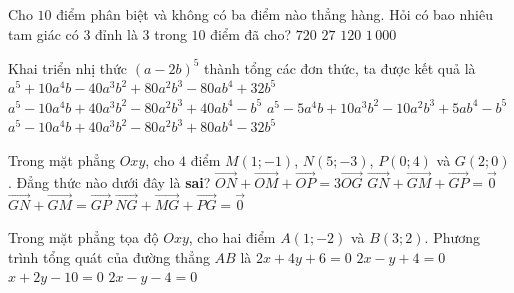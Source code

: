 \begin{ex}%
Cho $10$ điểm phân biệt và không có ba điểm nào thẳng hàng. Hỏi có bao nhiêu tam giác có $3$ đỉnh là $3$ trong $10$ điểm đã cho?
\choice
{$720$}
{$27$}
{\True $120$}
{$1\,000$}
\end{ex}

\begin{ex}%
Khai triển nhị thức $(a-2b)^5$ thành tổng các đơn thức, ta được kết quả là
\choice
{$a^5+ 10a^4b- 40a^3b^2+ 80a^2b^3- 80ab^4+ 32b^5$}
{$a^5- 10a^4b+ 40a^3b^2- 80a^2b^3+ 40ab^4- b^5$}
{$a^5- 5a^4b+ 10a^3b^2- 10a^2b^3+ 5ab^4- b^5$}
{\True $a^5- 10a^4b+ 40a^3b^2- 80a^2b^3+ 80ab^4- 32b^5$}
\end{ex}

\begin{ex}%
Trong mặt phẳng $Oxy$, cho $4$ điểm $M(1;-1)$, $N(5;-3)$, $P(0;4)$ và $G(2;0)$. Đẳng thức nào dưới đây là \textbf{sai}?
\choice
{$\overrightarrow{ON}+\overrightarrow{OM}+\overrightarrow{OP}=3\overrightarrow{OG}$}
{$\overrightarrow{GN}+\overrightarrow{GM}+\overrightarrow{GP}=\overrightarrow{0}$}
{\True $\overrightarrow{GN}+\overrightarrow{GM}=\overrightarrow{GP}$}
{$\overrightarrow{NG}+\overrightarrow{MG}+\overrightarrow{PG}=\overrightarrow{0}$}
\end{ex}

\begin{ex}%
Trong mặt phẳng tọa độ $O x y$, cho hai điểm $A(1 ;-2)$ và $B(3 ; 2)$. Phương trình tổng quát của đường thẳng $A B$ là
\choice
{$2 x+4 y+6=0$}
{$2 x-y+4=0$}
{$x+2 y-10=0$}
{\True $2 x-y-4=0$}
\end{ex}

